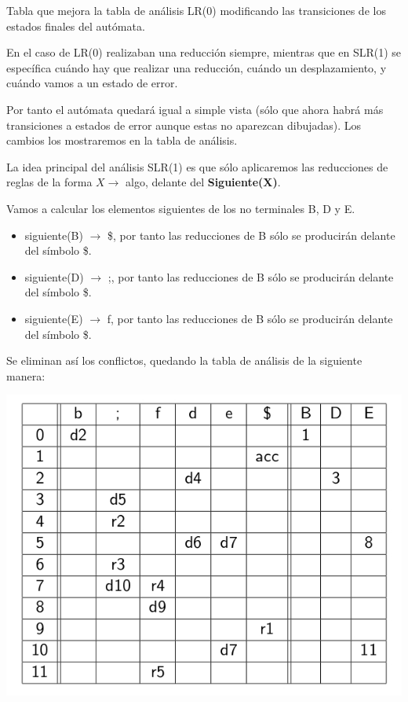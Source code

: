 \documentclass{apuntes}
\begin{document}
\begin{defn}
Tabla que mejora la tabla de análisis LR(0) modificando las transiciones de los estados finales del autómata.

En el caso de LR(0) realizaban una reducción siempre, mientras que en SLR(1) se específica cuándo hay que realizar una reducción, cuándo un desplazamiento, y cuándo vamos a un estado de error.
\end{defn}

Por tanto el autómata quedará igual a simple vista (sólo que ahora habrá más transiciones a estados de error aunque estas no aparezcan dibujadas). Los cambios los mostraremos en la tabla de análisis.

La idea principal del análisis SLR(1) es que sólo aplicaremos las reducciones de reglas de la forma $X \rightarrow $ algo, delante del \textbf{Siguiente(X)}.

Vamos a calcular los elementos siguientes de los no terminales B, D y E.

\begin{itemize}
\item siguiente(B) $\rightarrow$ {\$}, por tanto las reducciones de B sólo se producirán delante del símbolo \$.
\item siguiente(D) $\rightarrow$ {;}, por tanto las reducciones de B sólo se producirán delante del símbolo \$.
\item siguiente(E) $\rightarrow$ {f}, por tanto las reducciones de B sólo se producirán delante del símbolo \$.
\end{itemize}

Se eliminan así los conflictos, quedando la tabla de análisis de la siguiente manera:

\begin{center}
\includegraphics[scale=0.4]{img/tablaanalisisslr1.jpg}
\end{center}
\end{document}
